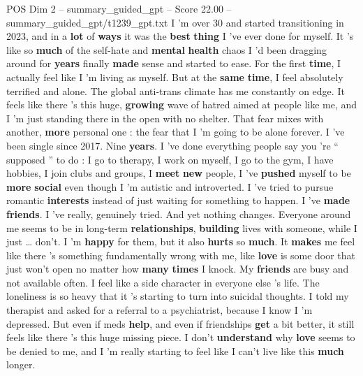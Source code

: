 \begin{textsample}{POS Dim 2 – summary\_guided\_gpt – Score 22.00 – summary\_guided\_gpt/t1239\_gpt.txt}  \label{ex:f2_pos_019}
I ’m over 30 and started transitioning in 2023, and in a \textbf{lot} of \textbf{ways} it was the \textbf{best} \textbf{thing} I ’ve ever done for myself.
It ’s like so \textbf{much} of the self-hate and \textbf{mental} \textbf{health} chaos I ’d been dragging around for \textbf{years} finally \textbf{made} sense and started to ease.
For the first \textbf{time}, I actually feel like I ’m living as myself.
But at the \textbf{same} \textbf{time}, I feel absolutely terrified and alone.
The global anti-trans climate has me constantly on edge.
It feels like there ’s this huge, \textbf{growing} wave of hatred aimed at people like me, and I ’m just standing there in the open with no shelter.
That fear mixes with another, \textbf{more} personal one : the fear that I ’m going to be alone forever.
I ’ve been single since 2017.
Nine \textbf{years}.
I ’ve done everything people say you ’re “ supposed ” to do : I go to therapy, I work on myself, I go to the gym, I have hobbies, I join clubs and groups, I \textbf{meet} \textbf{new} people, I ’ve \textbf{pushed} myself to be \textbf{more} \textbf{social} even though I ’m autistic and introverted.
I ’ve tried to pursue romantic \textbf{interests} instead of just waiting for something to happen.
I ’ve \textbf{made} \textbf{friends}.
I ’ve really, genuinely tried.
And yet nothing changes.
Everyone around me seems to be in long-term \textbf{relationships}, \textbf{building} lives with someone, while I just … don't.
I ’m \textbf{happy} for them, but it also \textbf{hurts} so \textbf{much}.
It \textbf{makes} me feel like there ’s something fundamentally wrong with me, like \textbf{love} is some door that just won't open no matter how \textbf{many} \textbf{times} I knock.
My \textbf{friends} are busy and not available often.
I feel like a side character in everyone else ’s life.
The loneliness is so heavy that it ’s starting to turn into suicidal thoughts.
I told my therapist and asked for a referral to a psychiatrist, because I know I ’m depressed.
But even if meds \textbf{help}, and even if friendships \textbf{get} a bit better, it still feels like there ’s this huge missing piece.
I don't \textbf{understand} why \textbf{love} seems to be denied to me, and I ’m really starting to feel like I can't live like this \textbf{much} longer.

\end{textsample}
